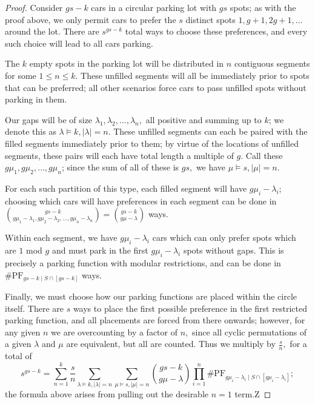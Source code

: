 \documentclass[12 pt]{amsart}
\theoremstyle{definition} %
\theoremstyle{remark} %
\begin{document}
\begin{proof}
    Consider $gs-k$ cars in a circular parking lot with $gs$ spots; as with the proof above, we only permit cars to prefer the $s$ distinct spots $1,g+1,2g+1,\ldots$ around the lot. There are $s^{gs-k}$ total ways to choose these preferences, and every such choice will lead to all cars parking.

    The $k$ empty spots in the parking lot will be distributed in $n$ contiguous segments for some $1\le n\le k.$ These unfilled segments will all be immediately prior to spots that can be preferred; all other scenarios force cars to pass unfilled spots without parking in them.

    Our gaps will be of size $\lambda_1,\lambda_2,\ldots,\lambda_n,$ all positive and summing up to $k$; we denote this as $\lambda\vDash k,|\lambda|=n.$ These unfilled segments can each be paired with the filled segments immediately prior to them; by virtue of the locations of unfilled segments, these pairs will each have total length a multiple of $g.$ Call these $g\mu_1,g\mu_2,\ldots,g\mu_n$; since the sum of all of these is $gs,$ we have $\mu\vDash s,|\mu|=n.$

    For each such partition of this type, each filled segment will have $g\mu_i-\lambda_i$; choosing which cars will have preferences in each segment can be done in $\binom{gs - k}{g \mu_1 - \lambda_1,g \mu_2 - \lambda_2,\ldots,g \mu_n - \lambda_n}=\binom{gs - k}{g \mu - \lambda}$ ways.
    
    Within each segment, we have $g\mu_i-\lambda_i$ cars which can only prefer spots which are $1$ mod $g$ and must park in the first $g\mu_i-\lambda_i$ spots without gaps. This is precisely a parking function with modular restrictions, and can be done in $\# \mathrm{PF}_{gs - k \mid S \cap [gs - k]}$ ways.

    Finally, we must choose how our parking functions are placed within the circle itself. There are $s$ ways to place the first possible preference in the first restricted parking function, and all placements are forced from there onwards; however, for any given $n$ we are overcounting by a factor of $n,$ since all cyclic permutations of a given $\lambda$ and $\mu$ are equivalent, but all are counted. Thus we multiply by $\frac{s}{n},$ for a total of 
    \[s^{gs - k} = \sum_{n = 1}^{k} \frac{s}{n} \sum_{\lambda \vDash k, \lvert \lambda \rvert = n} \sum_{\mu \vDash s, \lvert \mu \rvert = n} \binom{gs - k}{g \mu - \lambda} \prod_{i = 1}^{n} \# \mathrm{PF}_{g \mu_{i} - \lambda_{i} \mid S \cap [g \mu_{i} - \lambda_{i}]};\] the formula above arises from pulling out the desirable $n=1$ term.Z
\end{proof}
\end{document}
